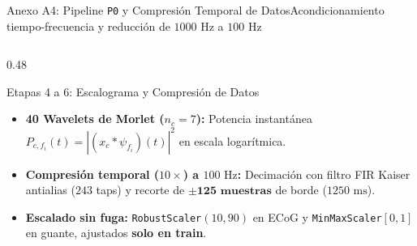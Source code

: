 \begin{frame}{Anexo A4: Pipeline \texttt{P0} y Compresi\'on Temporal de Datos}{Acondicionamiento tiempo-frecuencia y reducci\'on de $1000\text{ Hz}$ a $100\text{ Hz}$ \cite{kaplan2019decoding,rodas_valencia_tpe_ecog}}
\begin{columns}[T,onlytextwidth]
    \begin{column}{0.48\textwidth}
      \begin{block}{Etapas 4 a 6: Escalograma y Compresi\'on de Datos}
        \scriptsize
        \begin{itemize}\setlength{\itemsep}{3pt}
          \item \textbf{40 Wavelets de Morlet ($n_c=7$):} Potencia instant\'anea $P_{c,f_i}(t) = |(x_c * \psi_{f_i})(t)|^2$ en escala logar\'itmica.
          \item \textbf{Compresi\'on temporal ($10\times$) a $100\text{ Hz}$:} Decimaci\'on con filtro FIR Kaiser antialias ($243$ taps) y recorte de $\mathbf{\pm 125\text{ muestras}}$ de borde ($1250\text{ ms}$).
          \item \textbf{Escalado sin fuga:} \texttt{RobustScaler}$(10,90)$ en ECoG y \texttt{MinMaxScaler}$[0,1]$ en guante, ajustados \textbf{solo en train}.
        \end{itemize}
      \end{block}
    \end{column}
  \end{columns}
\end{frame}

